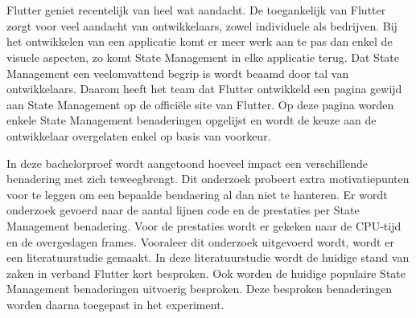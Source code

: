 
%
%



\chapter*{}
Flutter geniet recentelijk van heel wat aandacht. De toegankelijk van Flutter zorgt voor veel aandacht van ontwikkelaars, zowel individuele als bedrijven. Bij het ontwikkelen van een applicatie komt er meer werk aan te pas dan enkel de visuele aspecten, zo komt State Management in elke applicatie terug. Dat State Management een veelomvattend begrip is wordt beaamd door tal van ontwikkelaars. Daarom heeft het team dat Flutter ontwikkeld een pagina gewijd aan State Management op de officiële site van Flutter. Op deze pagina worden enkele State Management benaderingen opgelijst en wordt de keuze aan de ontwikkelaar overgelaten enkel op basis van voorkeur.\newline 

In deze bachelorproef wordt aangetoond hoeveel impact een verschillende benadering met zich teweegbrengt. Dit onderzoek probeert extra motivatiepunten voor te leggen om een bepaalde bendaering al dan niet te hanteren. Er wordt onderzoek gevoerd naar de aantal lijnen code en de prestaties per State Management benadering. Voor de prestaties wordt er gekeken naar de CPU-tijd en de overgeslagen frames.
\newline
Vooraleer dit onderzoek uitgevoerd wordt, wordt er een literatuurstudie gemaakt. In deze literatuurstudie wordt de huidige stand van zaken in verband Flutter kort besproken. Ook worden de huidige populaire State Management benaderingen uitvoerig besproken. Deze besproken benaderingen worden daarna toegepast in het experiment. \newline 

